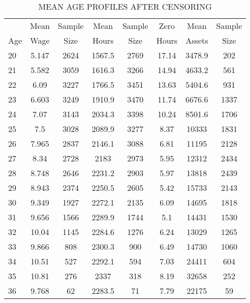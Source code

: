 
%
\begin{center}
  \hypertarget{AfterCensoring}{}
  \begin{table}
  \centering
    \caption{\label{tab:AfterCensoring}  \\
      \scriptsize MEAN AGE PROFILES AFTER CENSORING}
  \begin{tabular}{l c c c c c c c}
    \hline%
    {} & Mean & Sample & Mean & Sample & Zero & Mean & Sample \\
    Age & Wage & Size & Hours & Size & Hours & Assets & Size \\ \hline
        20 & 5.147 & 2624 & 1567.5 & 2769 & 17.14 & 3478.9 & 202 \\ 
        21 & 5.582 & 3059 & 1616.3 & 3266 & 14.94 & 4633.2 & 561 \\
        22 & 6.09 & 3227 & 1766.5 & 3451 & 13.63 & 5404.6 & 931 \\ 
        23 & 6.603 & 3249 & 1910.9 & 3470 & 11.74 & 6676.6 & 1337 \\ 
        24 & 7.07 & 3143 & 2034.3 & 3398 & 10.24 & 8501.6 & 1706 \\ 
        25 & 7.5 & 3028 & 2089.9 & 3277 & 8.37 & 10333 & 1831 \\ 
        26 & 7.965 & 2837 & 2146.1 & 3088 & 6.81 & 11195 & 2128 \\ 
        27 & 8.34 & 2728 & 2183 & 2973 & 5.95 & 12312 & 2434 \\ 
        28 & 8.748 & 2646 & 2231.2 & 2903 & 5.97 & 13818 & 2439 \\
        29 & 8.943 & 2374 & 2250.5 & 2605 & 5.42 & 15733 & 2143 \\ 
        30 & 9.349 & 1927 & 2272.1 & 2135 & 6.09 & 14695 & 1818 \\ 
        31 & 9.656 & 1566 & 2289.9 & 1744 & 5.1 & 14431 & 1530 \\
        32 & 10.04 & 1145 & 2284.6 & 1276 & 6.24 & 13029 & 1265 \\ 
        33 & 9.866 & 808 & 2300.3 & 900 & 6.49 & 14730 & 1060 \\ 
        34 & 10.51 & 527 & 2292.1 & 594 & 7.03 & 24411 & 604 \\ 
        35 & 10.81 & 276 & 2337 & 318 & 8.19 & 32658 & 252 \\ 
        36 & 9.768 & 62 & 2283.5 & 71 & 7.79 & 22175 & 59 \\ 
  \end{tabular}
  \end{table}
\end{center}

%
